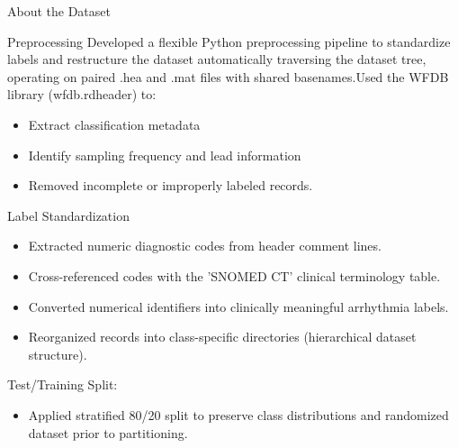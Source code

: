 \documentclass[final]{beamer}
\newlength{\colwidth}
\begin{document}
\begin{frame}[t]
\begin{columns}[t]
\begin{column}{\colwidth}
\begin{block}{About the Dataset}
				\end{block}
				
				\smallskip
				
				\begin{exampleblock}{Preprocessing}
					Developed a flexible Python preprocessing pipeline to standardize labels and restructure the dataset automatically traversing the dataset tree, operating on paired .hea and .mat files with shared basenames.Used the WFDB library (wfdb.rdheader) to:
					
					\begin{itemize}
						\item Extract classification metadata
						\item Identify sampling frequency and lead information
						\item Removed incomplete or improperly labeled records.
					\end{itemize}
					
					
					\bigskip
					
					Label Standardization
					
					\smallskip
					
					\begin{itemize}
						\item Extracted numeric diagnostic codes from header comment lines.
						\item Cross-referenced codes with the 'SNOMED CT' clinical terminology table.
						\item Converted numerical identifiers into clinically meaningful arrhythmia labels.
						\item Reorganized records into class-specific directories (hierarchical dataset structure).
					\end{itemize}
				
				\bigskip
				
					Test/Training Split: 
					
					\begin{itemize}
						\item Applied stratified 80/20 split to preserve class distributions and randomized dataset prior to partitioning.
					\end{itemize}
					
					\vspace{0.5em}
					
				
					
				\end{exampleblock}
				
			\end{column}
			

\end{columns}
\end{frame}
\end{document}
